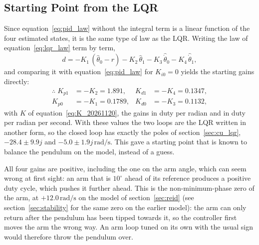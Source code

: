 \documentclass[a4paper,11pt]{article}
\begin{document}
\subsection{Starting Point from the LQR}
\label{sec:pid_start}
Since equation~\ref{eq:pid_law} without the integral term is a linear function of the four estimated states, it is the same type of law as the LQR. Writing the law of equation~\ref{eq:lqr_law} term by term,
\begin{equation}
  d = -K_1\,(\hat\theta_0 - r) - K_2\,\hat\theta_1 - K_3\,\hat{\dot\theta}_0 - K_4\,\hat{\dot\theta}_1 ,
\end{equation}
and comparing it with equation~\ref{eq:pid_law} for $K_{i0} = 0$ yields the starting gains directly:
\begin{equation}
  \begin{aligned}
  \therefore\; K_{p1} &= -K_2 = 1.891, & K_{d1} &= -K_4 = 0.1347,\\
  K_{p0} &= -K_1 = 0.1789, & K_{d0} &= -K_3 = 0.1132 ,
  \end{aligned}
  \label{eq:pid_from_lqr}
\end{equation}
with $K$ of equation~\ref{eq:K_20261120}, the gains in duty per radian and in duty per radian per second. With these values the two loops are the LQR written in another form, so the closed loop has exactly the poles of section~\ref{sec:cu_lqr}, $-28.4 \pm 9.9j$ and $-5.0 \pm 1.9j\,\mathrm{rad/s}$. This gave a starting point that is known to balance the pendulum on the model, instead of a guess.

All four gains are positive, including the one on the arm angle, which can seem wrong at first sight: an arm that is $10^\circ$ ahead of its reference produces a positive duty cycle, which pushes it further ahead. This is the non-minimum-phase zero of the arm, at $+12.0\,\mathrm{rad/s}$ on the model of section~\ref{sec:reid} (see section~\ref{sec:stability} for the same zero on the earlier model): the arm can only return after the pendulum has been tipped towards it, so the controller first moves the arm the wrong way. An arm loop tuned on its own with the usual sign would therefore throw the pendulum over.
\end{document}
